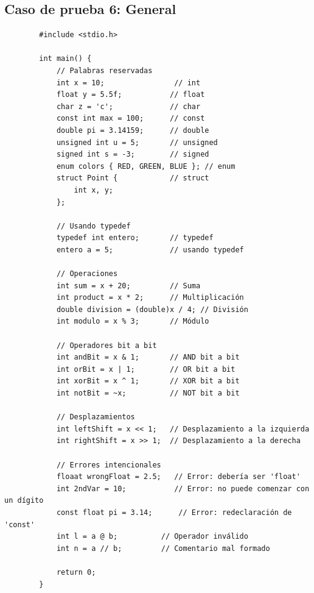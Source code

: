 \documentclass[a4paper,12pt]{article}
\begin{document}
\subsection*{Caso de prueba 6: General}
\begin{flushleft}
	\begin{verbatim}
		#include <stdio.h>
		
		int main() {
			// Palabras reservadas
			int x = 10;                // int
			float y = 5.5f;           // float
			char z = 'c';             // char
			const int max = 100;      // const
			double pi = 3.14159;      // double
			unsigned int u = 5;       // unsigned
			signed int s = -3;        // signed
			enum colors { RED, GREEN, BLUE }; // enum
			struct Point {            // struct
				int x, y;
			};
			
			// Usando typedef
			typedef int entero;       // typedef
			entero a = 5;             // usando typedef
			
			// Operaciones
			int sum = x + 20;         // Suma
			int product = x * 2;      // Multiplicación
			double division = (double)x / 4; // División
			int modulo = x % 3;       // Módulo
			
			// Operadores bit a bit
			int andBit = x & 1;       // AND bit a bit
			int orBit = x | 1;        // OR bit a bit
			int xorBit = x ^ 1;       // XOR bit a bit
			int notBit = ~x;          // NOT bit a bit
			
			// Desplazamientos
			int leftShift = x << 1;   // Desplazamiento a la izquierda
			int rightShift = x >> 1;  // Desplazamiento a la derecha
			
			// Errores intencionales
			floaat wrongFloat = 2.5;   // Error: debería ser 'float'
			int 2ndVar = 10;           // Error: no puede comenzar con un dígito
			const float pi = 3.14;      // Error: redeclaración de 'const'
			int l = a @ b;          // Operador inválido
			int n = a // b;         // Comentario mal formado
			
			return 0;
		}
		

\end{verbatim}
\end{flushleft}
\end{document}
